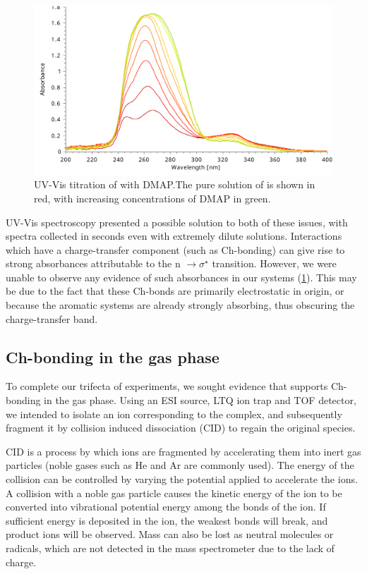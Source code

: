 \begin{refsection}
\begin{figure}
  \includegraphics[width=0.7\linewidth]{Figures/ebs-dmap-uv-titration.pdf}
  \caption[UV-Vis titration of  with DMAP.]{UV-Vis titration of  with DMAP.\@ The pure solution of  is shown in red, with increasing concentrations of DMAP in green.}\label{fig:ebs-dmap-uv-titration}
\end{figure}

UV-Vis spectroscopy presented a possible solution to both of these issues, with spectra collected in seconds even with extremely dilute solutions.
Interactions which have a charge-transfer component (such as Ch-bonding) can give rise to strong absorbances attributable to the n $\rightarrow \sigma^{\star}$ transition.\autocite{Blackstock1987}
However, we were unable to observe any evidence of such absorbances in our systems (\cref{fig:ebs-dmap-uv-titration}).
This may be due to the fact that these Ch-bonds are primarily electrostatic in origin, or because the aromatic systems are already strongly absorbing, thus obscuring the charge-transfer band.

\subsection{Ch-bonding in the gas phase}
To complete our trifecta of experiments, we sought evidence that supports Ch-bonding in the gas phase.
Using an ESI source, LTQ ion trap and TOF detector, we intended to isolate an ion corresponding to the complex, and subsequently fragment it by collision induced dissociation (CID) to regain the original species.

CID is a process by which ions are fragmented by accelerating them into inert gas particles (noble gases such as He and Ar are commonly used).
The energy of the collision can be controlled by varying the potential applied to accelerate the ions.
A collision with a noble gas particle causes the kinetic energy of the ion to be converted into vibrational potential energy among the bonds of the ion.
If sufficient energy is deposited in the ion, the weakest bonds will break, and product ions will be observed.
Mass can also be lost as neutral molecules or radicals, which are not detected in the mass spectrometer due to the lack of charge.


\end{refsection}
